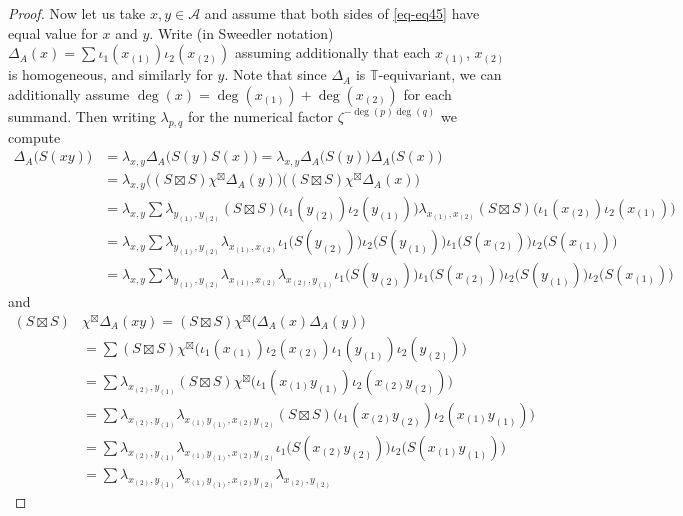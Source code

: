 \documentclass[12pt,reqno,a4paper]{amsart}
\theoremstyle{definition}
\newcommand{\TT}{\mathbb{T}}
\newcommand{\cA}{\mathscr{A}}
\numberwithin{equation}{section}
\begin{document}
\begin{proof}
Now let us take $x,y\in\cA$ and assume that both sides of \eqref{eq-eq45} have equal value for $x$ and $y$. Write (in Sweedler notation) $\Delta_A(x)=\sum \iota_1(x_{(1)})\iota_2(x_{(2)})$ assuming additionally that each $x_{(1)}$, $x_{(2)}$ is homogeneous, and similarly for $y$. Note that since $\Delta_A$ is $\TT$-equivariant, we can additionally assume $\deg(x)=\deg(x_{(1)})+\deg(x_{(2)})$ for each summand. Then writing $\lambda_{p,q}$ for the numerical factor $\zeta^{-\deg(p)\deg(q)}$ we compute
\begin{align*}
\Delta_A\bigl(S(xy)\bigr)
&=\lambda_{x,y}\Delta_A\bigl(S(y)S(x)\bigr)
=\lambda_{x,y}\Delta_A\bigl(S(y)\bigr)\Delta_A\bigl(S(x)\bigr)\\
&=\lambda_{x,y}\bigl((S\boxtimes S)\chi^\boxtimes\Delta_A(y)\bigr)
\bigl((S\boxtimes S)\chi^\boxtimes\Delta_A(x)\bigr)\\
&=\lambda_{x,y}\sum
\lambda_{y_{(1)},y_{(2)}}
(S\boxtimes S)\bigl(\iota_1(y_{(2)})\iota_2(y_{(1)})\bigr)
\lambda_{x_{(1)},x_{(2)}}(S\boxtimes S)\bigl(\iota_1(x_{(2)})\iota_2(x_{(1)})\bigr)\\
&=\lambda_{x,y}
\sum\lambda_{y_{(1)},y_{(2)}}
\lambda_{x_{(1)},x_{(2)}}
\iota_1\bigl(S(y_{(2)})\bigr)\iota_2\bigl(S(y_{(1)})\bigr)
\iota_1\bigl(S(x_{(2)})\bigr)\iota_2\bigl(S(x_{(1)})\bigr)\\
&=\lambda_{x,y}
\sum\lambda_{y_{(1)},y_{(2)}}
\lambda_{x_{(1)},x_{(2)}}\lambda_{x_{(2)},y_{(1)}}\iota_1\bigl(S(y_{(2)})\bigr)
\iota_1\bigl(S(x_{(2)})\bigr)\iota_2\bigl(S(y_{(1)})\bigr)\iota_2\bigl(S(x_{(1)})\bigr)
\end{align*}
and
\begin{align*}
(S\boxtimes S)&\chi^\boxtimes\Delta_A(xy)
=(S\boxtimes S)\chi^\boxtimes\bigl(\Delta_A(x)\Delta_A(y)\bigr)\\
&=\sum(S\boxtimes S)\chi^\boxtimes
\bigl(\iota_1(x_{(1)})\iota_2(x_{(2)})\iota_1(y_{(1)})\iota_2(y_{(2)})\bigr)\\
&=\sum\lambda_{x_{(2)},y_{(1)}}
(S\boxtimes S)\chi^\boxtimes\bigl(\iota_1(x_{(1)}y_{(1)})\iota_2(x_{(2)}y_{(2)})\bigr)\\
&=\sum\lambda_{x_{(2)},y_{(1)}}\lambda_{x_{(1)}y_{(1)},x_{(2)}y_{(2)}}
(S\boxtimes S)\bigl(\iota_1( x_{(2)}y_{(2)})\iota_2(x_{(1)}y_{(1)})\bigr)\\
&=\sum\lambda_{x_{(2)},y_{(1)}}
\lambda_{x_{(1)}y_{(1)},x_{(2)}y_{(2)}}
\iota_1\bigl(S(x_{(2)}y_{(2)})\bigr)\iota_2\bigl(S(x_{(1)}y_{(1)})\bigr)\\
&=\sum\lambda_{x_{(2)},y_{(1)}}
\lambda_{x_{(1)}y_{(1)},x_{(2)}y_{(2)}}
\lambda_{x_{(2)},y_{(2)}}

\end{align*}
\end{proof}
\end{document}
